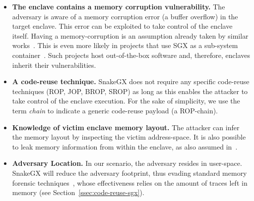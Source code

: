 \begin{itemize}
	\item \textbf{The enclave contains a memory corruption vulnerability.}  
	The adversary is aware of a memory corruption error (\eg a buffer overflow) 
	in the target enclave.
	This error can be exploited to take control of the enclave itself.
	Having a memory-corruption is an assumption already taken by similar 
	works~\cite{biondo2018guard,lee2017hacking}.
	This is even more likely in projects that use SGX as a sub-system 
	container~\cite{baumann2015shielding,203255,seo2017sgx,199364}.
	Such projects host out-of-the-box software and, therefore, enclaves inherit 
	their vulnerabilities.
	\item \textbf{A code-reuse technique.} 
	SnakeGX does not require any specific code-reuse techniques (\eg ROP, 
	JOP, BROP, SROP) as long as this enables the attacker to take control of 
	the enclave execution. For the sake of simplicity, we use 
	the term \emph{chain} to indicate a generic code-reuse payload 
	(\eg a ROP-chain).
	\item \textbf{Knowledge of victim enclave memory layout.} 
	The attacker can infer the memory layout by inspecting the victim 
	address-space.
	It is also possible to leak memory information from within the enclave, as
	also assumed in~\cite{biondo2018guard}.
	\item \textbf{Adversary Location.} In our scenario, the adversary 
	resides in user-space. SnakeGX will reduce the adversary
	footprint, thus evading standard memory forensic 	
	techniques~\cite{stancill2013check,polychronakis2011rop,kittel2015counteracting,Graziano:2016:RFA:2897845.2897894},
	whose effectiveness relies on the amount of traces left in memory 
	(see Section~\ref{ssec:code-reuse-sgx}).
\end{itemize}

